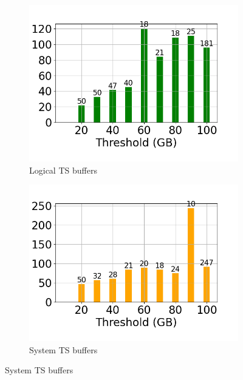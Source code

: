 \begin{figure}
	\centering
	\begin{subfigure}[c]{0.48\textwidth}
		\includegraphics[width=1\textwidth]   {figures/Experiments/Dynamic/Progress/2/average_query_time_per_batch_version_999777015_10485760_10_delay[2].png}
		\caption{Logical TS buffers}
		\label{fig:progress-queries-2-logical}
	\end{subfigure}
	\begin{subfigure}[c]{0.48\textwidth}
		\includegraphics[width=1\textwidth]   {figures/Experiments/Dynamic/Progress/2/average_query_time_per_batch_version_999777018_10485760_10_delay[2].png}
		\caption{System TS buffers}
		\label{fig:progress-queries-2-system}
	\end{subfigure}

\end{figure}
